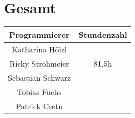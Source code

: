 \section{Gesamt}
\begin{center}
	\begin{tabular}{|c|c|}
		\hline \textbf{Programmierer} & \textbf{Stundenzahl} \\ 
		\hline Katharina Hölzl  &  \\ 
		\hline Ricky Strohmeier & 81,5h \\ 
		\hline Sebastian Schwarz &  \\ 
		\hline Tobias Fuchs &  \\ 
		\hline Patrick Cretu &  \\ 
		\hline 
	\end{tabular}
\end{center} 